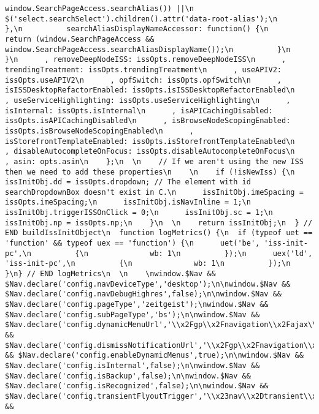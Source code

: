 \documentclass[
]{article}
\begin{document}
\begin{verbatim}
window.SearchPageAccess.searchAlias()) ||\n                   $('select.searchSelect').children().attr('data-root-alias');\n          },\n          searchAliasDisplayNameAccessor: function() {\n            return (window.SearchPageAccess && window.SearchPageAccess.searchAliasDisplayName());\n          }\n        }\n      , removeDeepNodeISS: issOpts.removeDeepNodeISS\n      , trendingTreatment: issOpts.trendingTreatment\n      , useAPIV2: issOpts.useAPIV2\n      , opfSwitch: issOpts.opfSwitch\n      , isISSDesktopRefactorEnabled: issOpts.isISSDesktopRefactorEnabled\n      , useServiceHighlighting: issOpts.useServiceHighlighting\n      , isInternal: issOpts.isInternal\n      , isAPICachingDisabled: issOpts.isAPICachingDisabled\n      , isBrowseNodeScopingEnabled: issOpts.isBrowseNodeScopingEnabled\n      , isStorefrontTemplateEnabled: issOpts.isStorefrontTemplateEnabled\n      , disableAutocompleteOnFocus: issOpts.disableAutocompleteOnFocus\n      , asin: opts.asin\n    };\n  \n    // If we aren't using the new ISS then we need to add these properties\n    \n    if (!isNewIss) {\n      issInitObj.dd = issOpts.dropdown; // The element with id searchDropdownBox doesn't exist in C.\n      issInitObj.imeSpacing = issOpts.imeSpacing;\n      issInitObj.isNavInline = 1;\n      issInitObj.triggerISSOnClick = 0;\n      issInitObj.sc = 1;\n      issInitObj.np = issOpts.np;\n    }\n  \n    return issInitObj;\n  } // END buildIssInitObject\n  function logMetrics() {\n  if (typeof uet == 'function' && typeof uex == 'function') {\n      uet('be', 'iss-init-pc',\n          {\n              wb: 1\n          });\n      uex('ld', 'iss-init-pc',\n          {\n              wb: 1\n          });\n  }\n} // END logMetrics\n  \n    \nwindow.$Nav && $Nav.declare('config.navDeviceType','desktop');\n\nwindow.$Nav && $Nav.declare('config.navDebugHighres',false);\n\nwindow.$Nav && $Nav.declare('config.pageType','zeitgeist');\nwindow.$Nav && $Nav.declare('config.subPageType','bs');\n\nwindow.$Nav && $Nav.declare('config.dynamicMenuUrl','\\x2Fgp\\x2Fnavigation\\x2Fajax\\x2Fdynamic\\x2Dmenu.html');\n\nwindow.$Nav && $Nav.declare('config.dismissNotificationUrl','\\x2Fgp\\x2Fnavigation\\x2Fajax\\x2Fdismissnotification.html');\n\nwindow.$Nav && $Nav.declare('config.enableDynamicMenus',true);\n\nwindow.$Nav && $Nav.declare('config.isInternal',false);\n\nwindow.$Nav && $Nav.declare('config.isBackup',false);\n\nwindow.$Nav && $Nav.declare('config.isRecognized',false);\n\nwindow.$Nav && $Nav.declare('config.transientFlyoutTrigger','\\x23nav\\x2Dtransient\\x2Dflyout\\x2Dtrigger');\n\nwindow.$Nav && 
\end{verbatim}
\end{document}
